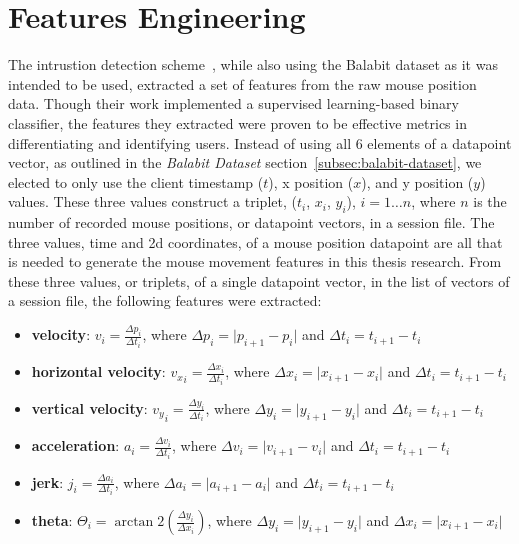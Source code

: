 
\section{Features Engineering}\label{sec:features-engineering}
The intrustion detection scheme~\cite{intrustion_detection_using_mouse_dynamics}, while also using the Balabit dataset as it was intended to be used, extracted a set of features from the raw mouse position data.
Though their work implemented a supervised learning-based binary classifier, the features they extracted were proven to be effective metrics in differentiating and identifying users.
Instead of using all 6 elements of a datapoint vector, as outlined in the \textit{Balabit Dataset} section~\ref{subsec:balabit-dataset}, we elected to only use the client timestamp ($t$), x position ($x$), and y position ($y$) values.
These three values construct a triplet, ($t_i$, $x_i$, $y_i$), $i = 1{\dots}n$, where $n$ is the number of recorded mouse positions, or datapoint vectors, in a session file.
The three values, time and 2d coordinates, of a mouse position datapoint are all that is needed to generate the mouse movement features in this thesis research.
From these three values, or triplets, of a single datapoint vector, in the list of vectors of a session file, the following features were extracted:
\begin{itemize}
    \item \textbf{velocity}: $v_i = \frac{\Delta p_i}{\Delta t_i}$, where $\Delta p_i = \lvert p_{i+1} - p_i \rvert$ and $\Delta t_i = t_{i+1} - t_i$
    \item \textbf{horizontal velocity}: ${v_x}_i = \frac{\Delta x_i}{\Delta t_i}$, where $\Delta x_i = \lvert x_{i+1} - x_i \rvert$ and $\Delta t_i = t_{i+1} - t_i$
    \item \textbf{vertical velocity}: ${v_y}_i = \frac{\Delta y_i}{\Delta t_i}$, where $\Delta y_i = \lvert y_{i+1} - y_i \rvert$ and $\Delta t_i = t_{i+1} - t_i$
    \item \textbf{acceleration}: $a_i = \frac{\Delta v_i}{\Delta t_i}$, where $\Delta v_i = \lvert v_{i+1} - v_i \rvert$ and $\Delta t_i = t_{i+1} - t_i$
    \item \textbf{jerk}: $j_i = \frac{\Delta a_i}{\Delta t_i}$, where $\Delta a_i = \lvert a_{i+1} - a_i \rvert$ and $\Delta t_i = t_{i+1} - t_i$
    \item \textbf{theta}: $\Theta _i = \arctan 2(\frac{\Delta y_i}{\Delta x_i})$, where $\Delta y_i = \lvert y_{i+1} - y_i \rvert$ and $\Delta x_i = \lvert x_{i+1} - x_i \rvert$
\end{itemize}

